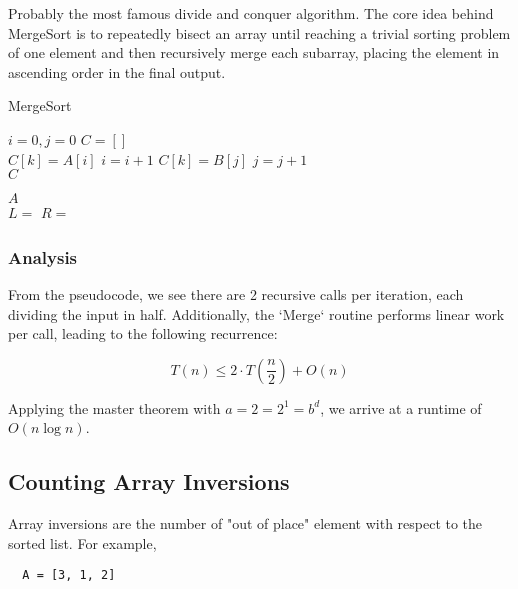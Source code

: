 \documentclass{standalone}
\begin{document}
Probably the most famous divide and conquer algorithm. The core idea behind MergeSort is to repeatedly bisect an array until reaching a trivial sorting problem of one element and then recursively merge each subarray, placing the element in ascending order in the final output.

\begin{algorithm}
  \caption{MergeSort}
  \begin{algorithmic}
      \State $i = 0, j = 0$
      \State $C = []$ \\
          \State $C[k] = A[i]$
          \State $i = i + 1$
        \Else
        \State $C[k] = B[j]$
        \State $j = j + 1$ \\
      \EndIf
      \EndFor
      \Return $C$ \\
    \EndProcedure

        \Return $A$ \\
      \EndIf
      \State $L =$ 
      \State $R =$  \\
      \Return {}
    \EndProcedure
  \end{algorithmic}
\end{algorithm}

\subsubsection{Analysis}

From the pseudocode, we see there are 2 recursive calls per iteration, each dividing the input in half. Additionally, the `Merge` routine performs linear work per call, leading to the following recurrence:

\[
  T(n) \leqslant 2 \cdot T(\frac n 2) + O(n)
\]

Applying the master theorem with $a = 2 = 2^1 = b^d$, we arrive at a runtime of $O(n\log n)$.

\subsection{Counting Array Inversions}

Array inversions are the number of "out of place" element with respect to the sorted list. For example,

\begin{verbatim}
  A = [3, 1, 2]
\end{verbatim}
\end{document}

